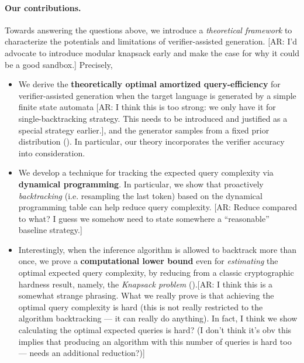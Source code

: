 \paragraph{Our contributions.}
Towards answering the questions above, we introduce a \emph{theoretical framework} to characterize the potentials and limitations of verifier-assisted generation.
[AR: I'd advocate to introduce modular knapsack early and make the case for why it could be a good sandbox.]
Precisely, 
\begin{itemize}%
\setlength\itemsep{-0.1ex}
    \item We derive the \textbf{theoretically optimal amortized query-efficiency} for verifier-assisted generation 
    when the target language is generated by a simple finite state automata [AR: I think this is too strong: we only have it for single-backtracking strategy. This needs to be introduced and justified as a special strategy earlier.],
    and the generator samples from a fixed prior distribution
    (). 
    In particular, our theory incorporates the verifier accuracy into consideration.
    \item We develop a technique for tracking the expected query complexity via \textbf{dynamical programming}.
    In particular, 
    we show that proactively \emph{backtracking} (i.e. resampling the last token) based on the dynamical programming table can help reduce query complexity. [AR: Reduce compared to what? I guess we somehow need to state somewhere a ``reasonable'' baseline strategy.]
    \item Interestingly, when the inference algorithm is allowed to backtrack more than once, 
    we prove a \textbf{computational lower bound} even for \emph{estimating} the optimal expected query complexity,
    by reducing from a classic cryptographic hardness result, namely, the \emph{Knapsack problem} \citep{chor1988knapsack, nguyen2005adapting, vigoda2010lecture, gopalan2011fptas, plantard2013lattice}
    ().[AR: I think this is a somewhat strange phrasing. What we really prove is that achieving the optimal query complexity is hard (this is not really restricted to the algorithm backtracking --- it can really do anything). In fact, I think we show calculating the optimal expected queries is hard? (I don't think it's obv this implies that producing an algorithm with this number of queries is hard too --- needs an additional reduction?)]
\end{itemize}


